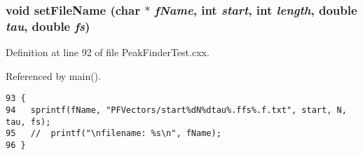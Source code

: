 \subsubsection{\setlength{\rightskip}{0pt plus 5cm}void set\-File\-Name (char $\ast$ {\em f\-Name}, int {\em start}, int {\em length}, double {\em tau}, double {\em fs})}\label{PeakFinderTest_8cxx_a0}




Definition at line 92 of file Peak\-Finder\-Test.cxx.

Referenced by main().

\footnotesize\begin{verbatim}93 {
94   sprintf(fName, "PFVectors/start%dN%dtau%.ffs%.f.txt", start, N, tau, fs);
95   //  printf("\nfilename: %s\n", fName);
96 }
\end{verbatim}\normalsize 


